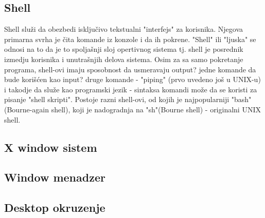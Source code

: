 \subsection{Shell}
Shell služi da obezbedi isključivo tekstualni "interfejs" za korisnika. Njegova primarna svrha je čita komande iz konzole i da ih pokrene. "Shell" ili "ljuska" se odnosi na to da je to spoljašnji sloj opertivnog sistema tj. shell je posrednik izmedju korisnika i unutrašnjih delova sistema. Osim za sa samo pokretanje programa, shell-ovi imaju sposobnost da usmeravaju output? jedne komande da bude korišćen kao input? druge komande - "piping" (prvo uvedeno još u UNIX-u) i takodje da služe kao programski jezik - sintaksa komandi može da se koristi za pisanje "shell skripti". Postoje razni shell-ovi, od kojih je najpopularniji "bash"(Bourne-again shell),  koji je nadogradnja na "sh"(Bourne shell) - originalni UNIX shell.
\subsection{X window sistem}
\subsection{Window menadzer}
\subsection{Desktop okruzenje}